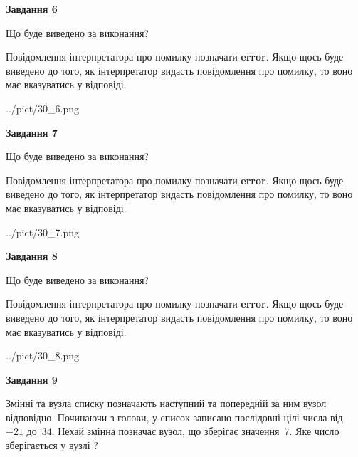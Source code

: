 \documentclass[12pt, ukrainian]{article}
\begin{document}
{\begin {large}
{\begin {center}\textbf{Завдання 6}\end {center}}\par
Що буде виведено за виконання?

Повідомлення інтерпретатора про помилку позначати \textbf{error}.
Якщо щось буде виведено до того, як інтерпретатор видасть повідомлення про помилку, 
то воно має вказуватись у відповіді. \par


\begin{center}
	{../pict/30_6.png}
\end{center}
\newpage

{\begin {center}\textbf{Завдання 7}\end {center}}\par
Що буде виведено за виконання?

Повідомлення інтерпретатора про помилку позначати \textbf{error}.
Якщо щось буде виведено до того, як інтерпретатор видасть повідомлення про помилку, 
то воно має вказуватись у відповіді. \par


\begin{center}
	{../pict/30_7.png}
\end{center}
\newpage

{\begin {center}\textbf{Завдання 8}\end {center}}\par
Що буде виведено за виконання?

Повідомлення інтерпретатора про помилку позначати \textbf{error}.
Якщо щось буде виведено до того, як інтерпретатор видасть повідомлення про помилку, 
то воно має вказуватись у відповіді. \par


\begin{center}
	{../pict/30_8.png}
\end{center}
\newpage

{\begin {center}\textbf{Завдання 9}\end {center}}\par
Змінні  та  вузла списку позначають наступний та попередній за ним вузол відповідно. Починаючи з голови, у список записано послідовні цілі числа від~$-21$ до~$34$. Нехай змінна  позначає вузол, що зберігає значення~$7$.
Яке число зберігається у вузлі  ?\par
\newpage


\end{large}}
\end{document}
